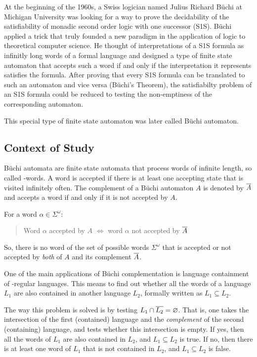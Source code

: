 At the beginning of the 1960s, a Swiss logician named Julius Richard Büchi at Michigan University was looking for a way to prove the decidability of the satisfiability of monadic second order logic with one successor (S1S). Büchi applied a trick that truly founded a new paradigm in the application of logic to theoretical computer science. He thought of interpretations of a S1S formula as infinitly long words of a formal language and designed a type of finite state automaton that accepts such a word if and only if the interpretation it represents satisfies the formula. After proving that every S1S formula can be translated to such an automaton and vice versa (Büchi's Theorem), the satisfiabilty problem of an S1S formula could be reduced to testing the non-emptiness of the corresponding automaton.

This special type of finite state automaton was later called Büchi automaton.

\subsection{Context of Study}

Büchi automata are finite state automata that process words of infinite length, so called \om-words. A word is accepted if there is at least one accepting state that is visited infinitely often. The complement of a Büchi automaton $A$ is denoted by $\cl1{A}$ and accepts a word if and only if it is not accepted by $A$.

For a word $\alpha \in \Sigma^\omega$:

\begin{quote}
\centering
Word $\alpha$ accepted by $A$ $\Longleftrightarrow$ word $\alpha$ not accepted by $\cl1{A}$
\end{quote}

So, there is no word of the set of possible words $\Sigma^\omega$ that is accepted or not accepted by \textit{both} of $A$ and its complement $\cl1{A}$.

One of the main applications of Büchi complementation is language containment of \om-regular languages. This means to find out whether all the words of a language $L_1$ are also contained in another language $L_2$, formally written as $L_1 \subseteq L_2$.

The way this problem is solved is by testing $L_1 \cap \cl1{L_2} = \varnothing$. That is, one takes the intersection of the first (contained) language and the \textit{complement} of the second (containing) language, and tests whether this intersection is empty. If yes, then all the words of $L_1$ are also contained in $L_2$, and $L_1 \subseteq L_2$ is true. If no, then there is at least one word of $L_1$ that is not contained in $L_2$, and $L_1 \subseteq L_2$ is false.

